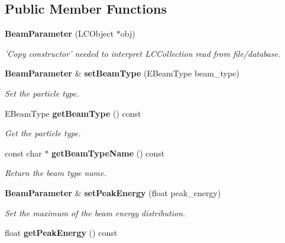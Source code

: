 \subsection*{Public Member Functions}
\begin{DoxyCompactItemize}
\item 
{\bf Beam\-Parameter} (L\-C\-Object $\ast$obj)\label{classCALICE_1_1BeamParameter_ac34c61a0ff07d533fa175cdea702b8fe}

\begin{DoxyCompactList}\small\item\em 'Copy constructor' needed to interpret L\-C\-Collection read from file/database. \end{DoxyCompactList}\item 
{\bf Beam\-Parameter} \& {\bf set\-Beam\-Type} (E\-Beam\-Type beam\-\_\-type)\label{classCALICE_1_1BeamParameter_a91a84f9a224e2b2840fe1aa1e8bab3ec}

\begin{DoxyCompactList}\small\item\em Set the particle type. \end{DoxyCompactList}\item 
E\-Beam\-Type {\bf get\-Beam\-Type} () const \label{classCALICE_1_1BeamParameter_af8ed22618fedce8bd2840c658ed79ee0}

\begin{DoxyCompactList}\small\item\em Get the particle type. \end{DoxyCompactList}\item 
const char $\ast$ {\bf get\-Beam\-Type\-Name} () const \label{classCALICE_1_1BeamParameter_ae2ffbfa7c92c6057139bd4a8b5b1fe8c}

\begin{DoxyCompactList}\small\item\em Return the beam type name. \end{DoxyCompactList}\item 
{\bf Beam\-Parameter} \& {\bf set\-Peak\-Energy} (float peak\-\_\-energy)\label{classCALICE_1_1BeamParameter_a9868e1e09ffff9f945faa8427f5f5ef5}

\begin{DoxyCompactList}\small\item\em Set the maximum of the beam energy distribution. \end{DoxyCompactList}\item 
float {\bf get\-Peak\-Energy} () const \label{classCALICE_1_1BeamParameter_aecdce6fd9dc5911ea36a41a73ed04c72}


\end{DoxyCompactItemize}
